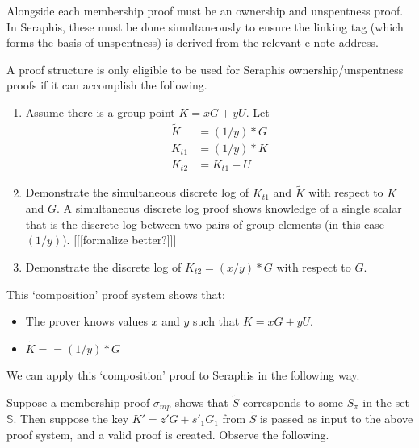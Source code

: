 Alongside each membership proof must be an ownership and unspentness proof. In Seraphis, these must be done simultaneously to ensure the linking tag (which forms the basis of unspentness) is derived from the relevant e-note address.

A proof structure is only eligible to be used for Seraphis ownership/unspentness proofs if it can accomplish the following.

\begin{enumerate}
    \item Assume there is a group point $K = x G + y U$. Let\vspace{.115cm}
    \begin{align*}
        \tilde{K} &= (1/y)*G \\
        K_{t1} &= (1/y)*K \\
        K_{t2} &= K_{t1} - U
    \end{align*}

    \item Demonstrate the simultaneous discrete log of $K_{t1}$ and $\tilde{K}$ with respect to $K$ and $G$. A simultaneous discrete log proof shows knowledge of a single scalar that is the discrete log between two pairs of group elements (in this case $(1/y)$). [[[formalize better?]]]

    \item Demonstrate the discrete log of $K_{t2} = (x/y)*G$ with respect to $G$.
\end{enumerate}

This `composition' proof system shows that:

\begin{itemize}
    \item The prover knows values $x$ and $y$ such that $K = x G + y U$.

    \item $\tilde{K} == (1/y)*G$
\end{itemize}

We can apply this `composition' proof to Seraphis in the following way.

Suppose a membership proof $\sigma_{mp}$ shows that $\tilde{S}$ corresponds to some $S_{\pi}$ in the set $\mathbb{S}$. Then suppose the key $K' = z' G + s'_1 G_1$ from $\tilde{S}$ is passed as input to the above proof system, and a valid proof is created. Observe the following.

